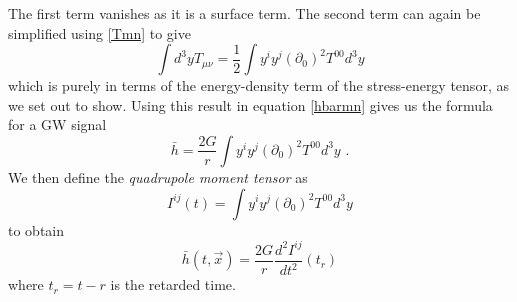 \documentclass[11pt]{cuthesis}
\newcommand{\mn}{_{\mu\nu}}
\newcommand{\fs}{\text{ .}}
\begin{document}
The first term vanishes as it is a surface term. The second term can again be simplified using \ref{Tmn} to give
\begin{equation}
\int d^3 y  T\mn = \frac{1}{2}\int y^i y^j (\partial_0)^2 T^{00}d^3 y
\end{equation}
which is purely in terms of the energy-density term of the stress-energy tensor, as we set out to show. Using this result in equation \ref{hbarmn} gives us the formula for a GW signal
\begin{equation}
\bar{h} = \frac{2G}{r} \int y^i y^j  (\partial_0)^2 T^{00}d^3 y \fs
\end{equation}
We then define the \textit{quadrupole moment tensor} as 
\begin{equation} \label{quad tensor}
I^{ij}(t) = \int y^i y^j  (\partial_0)^2 T^{00}d^3 y
\end{equation}
to obtain
\begin{equation} \label{quad formula}
\bar{h}(t,\vec{x}) = \frac{2G}{r}\frac{d^2I^{ij}}{dt^2}(t_r)
\end{equation}
where $t_r=t-r$ is the retarded time. 
\end{document}
